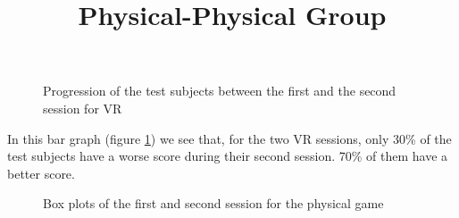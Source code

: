 \documentclass[12pt, openany, twocolumn]{article}
\begin{document}
                \begin{figure}[H]
                    \centering
                    \setlength{\fboxsep}{0pt}
                    \caption{Progression of the test subjects between the first and the second session for VR}
                    \label{figure10}
                \end{figure}

            In this bar graph (figure \ref{figure10}) we see that, for the two VR sessions, only 30\% of the test subjects have a worse score during their second session. 
            70\% of them have a better score.
            \\

            \noindent \title{\textbf{Physical-Physical Group}}           
                \begin{figure}[H]
                    \centering
                    \setlength{\fboxsep}{0pt}
                    \caption{Box plots of the first and second session for the physical game}
                    \label{figure11}
                \end{figure}
\end{document}
